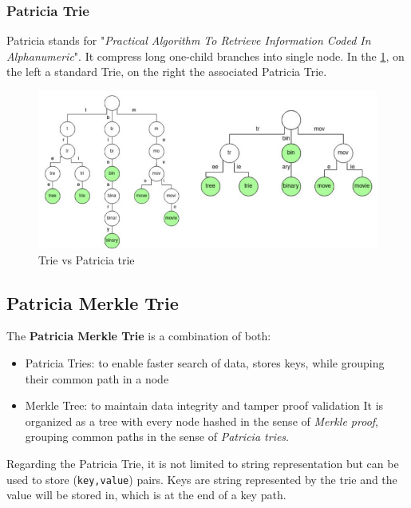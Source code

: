 \documentclass[10pt,a4paper]{report}
\begin{document}
\subsubsection{Patricia Trie}\label{sec:patricia-trie}
Patricia stands for "\textit{Practical Algorithm To Retrieve Information Coded In Alphanumeric}". It compress long one-child branches into single node. In the \ref{comparing-trie}, on the left a standard Trie, on the right the associated Patricia Trie.
\begin{figure}[h]
	\centering
	\includegraphics[scale=0.50]{images/Pasted image 20230317172227.png}
	\caption{Trie vs Patricia trie}
	\label{comparing-trie}
\end{figure}

\subsection{Patricia Merkle Trie}\label{sec:5-patricia-merkle-trie}
The \textbf{Patricia Merkle Trie} is a combination of both:
\begin{itemize}
	\item 
	Patricia Tries: to enable faster search of data, stores keys, while grouping their common path in a node
	\item 
	Merkle Tree: to maintain data integrity and tamper proof validation
	It is organized as a tree with every node hashed in the sense of \textit{Merkle proof}, grouping common paths in the sense of \textit{Patricia tries}.
\end{itemize}

Regarding the Patricia Trie, it is not limited to string representation but can be used to store (\texttt{key,value}) pairs. Keys are string represented by the trie and the value will be stored in, which is at the end of a key path.
\end{document}
